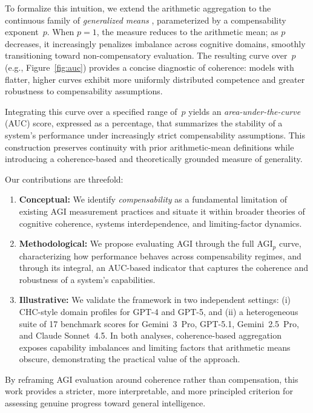 \documentclass{article}
\begin{document}
To formalize this intuition, we extend the arithmetic aggregation to the continuous family of \emph{generalized means} \citep{bullen2013handbook}, parameterized by a compensability exponent~$p$. When $p = 1$, the measure reduces to the arithmetic mean; as $p$ decreases, it increasingly penalizes imbalance across cognitive domains, smoothly transitioning toward non-compensatory evaluation. The resulting curve over~$p$ (e.g., Figure~\ref{fig:auc}) provides a concise diagnostic of coherence: models with flatter, higher curves exhibit more uniformly distributed competence and greater robustness to compensability assumptions.

Integrating this curve over a specified range of~$p$ yields an \emph{area-under-the-curve} (AUC) score, expressed as a percentage, that summarizes the stability of a system’s performance under increasingly strict compensability assumptions. This construction preserves continuity with prior arithmetic-mean definitions while introducing a coherence-based and theoretically grounded measure of generality.

Our contributions are threefold:
\begin{enumerate}
\item \textbf{Conceptual:} We identify \emph{compensability} as a fundamental limitation of existing AGI measurement practices and situate it within broader theories of cognitive coherence, systems interdependence, and limiting-factor dynamics. %

\item \textbf{Methodological:} We propose evaluating AGI through the full AGI\(_p\) curve, characterizing how performance behaves across compensability regimes, and through its integral, an AUC-based indicator that captures the coherence and robustness of a system’s capabilities.

\item \textbf{Illustrative:} We validate the framework in two independent settings: (i) CHC-style domain profiles for GPT-4 and GPT-5, and (ii) a heterogeneous suite of 17 benchmark scores for Gemini~3~Pro, GPT-5.1, Gemini~2.5~Pro, and Claude Sonnet~4.5. In both analyses, coherence-based aggregation exposes capability imbalances and limiting factors that arithmetic means obscure, demonstrating the practical value of the approach.
\end{enumerate}

By reframing AGI evaluation around coherence rather than compensation, this work provides a stricter, more interpretable, and more principled criterion for assessing genuine progress toward general intelligence.
\end{document}
